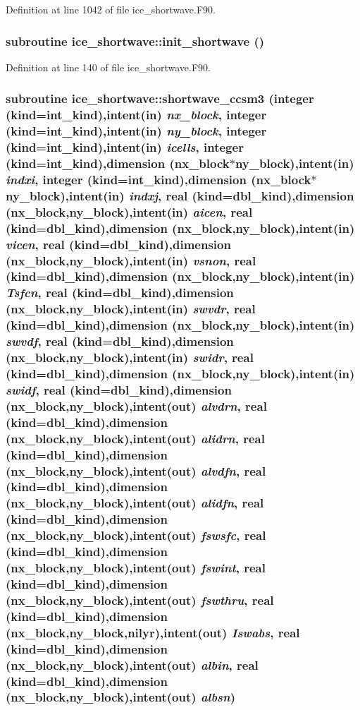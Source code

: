Definition at line 1042 of file ice\_\-shortwave.F90.\hypertarget{namespaceice__shortwave_a7fcf82fc93a6d2834b14022890d38a39}{
\subsubsection[{init\_\-shortwave}]{\setlength{\rightskip}{0pt plus 5cm}subroutine ice\_\-shortwave::init\_\-shortwave ()}}
\label{namespaceice__shortwave_a7fcf82fc93a6d2834b14022890d38a39}


Definition at line 140 of file ice\_\-shortwave.F90.\hypertarget{namespaceice__shortwave_ac077c2ab2eaf6ffb2c973427e9a9b2d0}{
\subsubsection[{shortwave\_\-ccsm3}]{\setlength{\rightskip}{0pt plus 5cm}subroutine ice\_\-shortwave::shortwave\_\-ccsm3 (integer (kind=int\_\-kind),intent(in) {\em nx\_\-block}, \/  integer (kind=int\_\-kind),intent(in) {\em ny\_\-block}, \/  integer (kind=int\_\-kind),intent(in) {\em icells}, \/  integer (kind=int\_\-kind),dimension (nx\_\-block$\ast$ny\_\-block),intent(in) {\em indxi}, \/  integer (kind=int\_\-kind),dimension (nx\_\-block$\ast$ny\_\-block),intent(in) {\em indxj}, \/  real (kind=dbl\_\-kind),dimension (nx\_\-block,ny\_\-block),intent(in) {\em aicen}, \/  real (kind=dbl\_\-kind),dimension (nx\_\-block,ny\_\-block),intent(in) {\em vicen}, \/  real (kind=dbl\_\-kind),dimension (nx\_\-block,ny\_\-block),intent(in) {\em vsnon}, \/  real (kind=dbl\_\-kind),dimension (nx\_\-block,ny\_\-block),intent(in) {\em Tsfcn}, \/  real (kind=dbl\_\-kind),dimension (nx\_\-block,ny\_\-block),intent(in) {\em swvdr}, \/  real (kind=dbl\_\-kind),dimension (nx\_\-block,ny\_\-block),intent(in) {\em swvdf}, \/  real (kind=dbl\_\-kind),dimension (nx\_\-block,ny\_\-block),intent(in) {\em swidr}, \/  real (kind=dbl\_\-kind),dimension (nx\_\-block,ny\_\-block),intent(in) {\em swidf}, \/  real (kind=dbl\_\-kind),dimension (nx\_\-block,ny\_\-block),intent(out) {\em alvdrn}, \/  real (kind=dbl\_\-kind),dimension (nx\_\-block,ny\_\-block),intent(out) {\em alidrn}, \/  real (kind=dbl\_\-kind),dimension (nx\_\-block,ny\_\-block),intent(out) {\em alvdfn}, \/  real (kind=dbl\_\-kind),dimension (nx\_\-block,ny\_\-block),intent(out) {\em alidfn}, \/  real (kind=dbl\_\-kind),dimension (nx\_\-block,ny\_\-block),intent(out) {\em fswsfc}, \/  real (kind=dbl\_\-kind),dimension (nx\_\-block,ny\_\-block),intent(out) {\em fswint}, \/  real (kind=dbl\_\-kind),dimension (nx\_\-block,ny\_\-block),intent(out) {\em fswthru}, \/  real (kind=dbl\_\-kind),dimension (nx\_\-block,ny\_\-block,nilyr),intent(out) {\em Iswabs}, \/  real (kind=dbl\_\-kind),dimension (nx\_\-block,ny\_\-block),intent(out) {\em albin}, \/  real (kind=dbl\_\-kind),dimension (nx\_\-block,ny\_\-block),intent(out) {\em albsn})}}
\label{namespaceice__shortwave_ac077c2ab2eaf6ffb2c973427e9a9b2d0}


